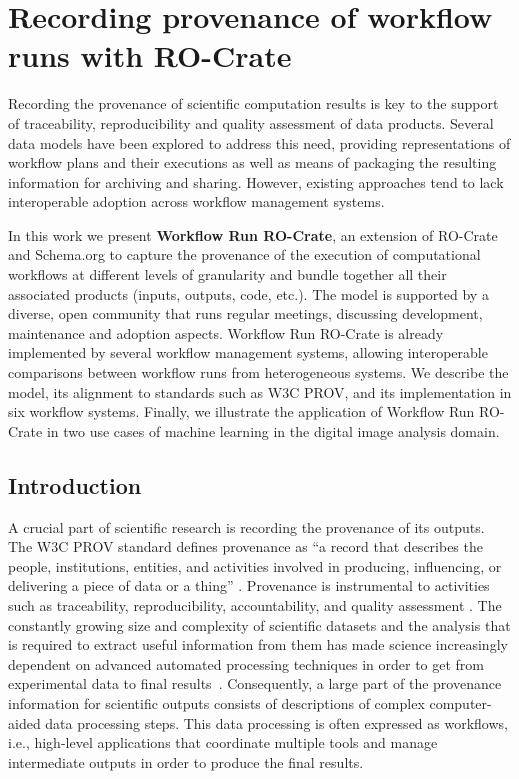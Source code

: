 \section{Recording provenance of workflow runs with RO-Crate}
\label{ch54:wrroc}

Recording the provenance of scientific computation results is key to the support of traceability, reproducibility and quality assessment of data products.
Several data models have been explored to address this need, providing representations of workflow plans and their executions as well as means of packaging the resulting information for archiving and sharing.
However, existing approaches tend to lack interoperable adoption across workflow management systems.

In this work we present \textbf{Workflow Run RO-Crate}, an extension of 
\acrfull{RO-Crate} 
and Schema.org to capture the provenance of the execution of computational workflows at different levels of granularity and bundle together all their associated products (inputs, outputs, code, etc.).
The model is supported by a diverse, open community that runs regular meetings, discussing development, maintenance and adoption aspects.
Workflow Run RO-Crate is already implemented by several workflow management systems, allowing interoperable comparisons between workflow runs from heterogeneous systems.
We describe the model, its alignment to standards such as W3C PROV, and its implementation in six workflow systems.
Finally, we illustrate the application of Workflow Run RO-Crate in two use cases of machine learning in the digital image analysis domain.



\subsection{Introduction}\label{ch54:introduction}

A crucial part of scientific research is recording the provenance of its outputs.
The W3C PROV standard defines provenance as ``a record that describes the people, institutions, entities, and activities involved in producing, influencing, or delivering a piece of data or a thing''
\cite{Moreau 2013}.
Provenance is instrumental to activities such as traceability, reproducibility, accountability, and quality assessment
\cite{Herschel 2017}.
The constantly growing size and complexity of scientific datasets and the analysis that is required to extract useful information from them has made science increasingly dependent on advanced automated processing techniques in order to get from experimental data to final results~\cite{Himanen 2019,Gauthier 2019,Huntingford 2019}.
Consequently, a large part of the provenance information for scientific outputs consists of descriptions of complex computer-aided data processing steps. This data processing is often expressed as workflows, i.e., high-level applications that coordinate multiple tools and manage intermediate outputs in order to produce the final results.

